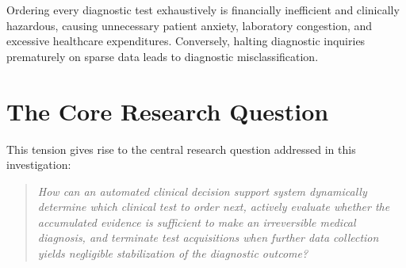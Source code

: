 \documentclass[11pt,a4paper]{report}
\begin{document}
Ordering every diagnostic test exhaustively is financially inefficient and clinically hazardous, causing unnecessary patient anxiety, laboratory congestion, and excessive healthcare expenditures. Conversely, halting diagnostic inquiries prematurely on sparse data leads to diagnostic misclassification.

\section{The Core Research Question}
This tension gives rise to the central research question addressed in this investigation:
\begin{quote}
  \textit{How can an automated clinical decision support system dynamically determine which clinical test to order next, actively evaluate whether the accumulated evidence is sufficient to make an irreversible medical diagnosis, and terminate test acquisitions when further data collection yields negligible stabilization of the diagnostic outcome?}
\end{quote}
\end{document}
